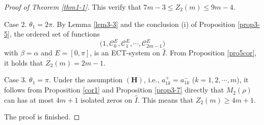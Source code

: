\documentclass[11pt]{amsart}
\theoremstyle{remark}
\theoremstyle{definition}
\begin{document}
\begin{proof}[Proof of Theorem \ref{thm1-1}]
 This verify that  $ 7m-3\leq Z_2(m)\leq 9m-4$.



Case 2.    $\theta_1=2\pi$.  By  Lemma  \ref{lem3-3} and the conclusion (i) of Proposition \ref{prop3-5},
the ordered set of functions
\begin{equation*} \bigg(1, \mathcal{C}_{0}^{E}, \mathcal{C}_{1}^{E},   \cdots, \mathcal{C}_{2m-1}^{E}\bigg) \end{equation*}
with $\beta=\alpha$ and $E=[0,\pi]$, is an ECT-system on  $\hat{I}$.    From Proposition  \ref{pro5cor},       it holds  that $Z_2(m)=2m-1$.







Case 3.    $\theta_1=\pi$. Under the assumption $(\mathbf{H})$, i.e.,  $a_{1k}^+=a_{1k}^-$ ($k=1, 2, \cdots, m$),  it follows from   Proposition \ref{cor1}  and Proposition  \ref{prop3-7} directly that
$M_2(\rho)$ can has at most $4m+1$ isolated zeros  on $\hat{I}$. This means that
  $Z_2(m)\geq 4m+1$.



The proof is finished.
\end{proof}
\end{document}
